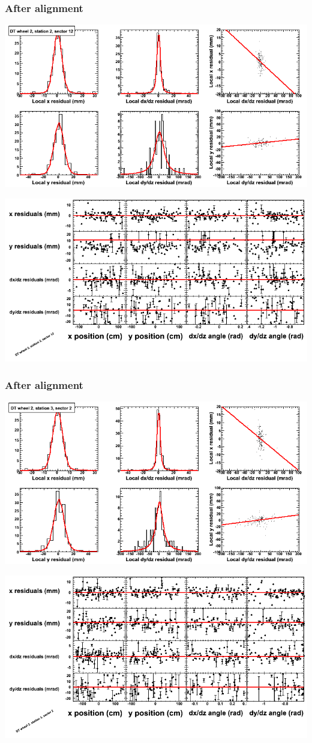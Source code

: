 \documentclass[compress]{beamer}
\begin{document}
\begin{frame}
\frametitle{After alignment}
\includegraphics[width=0.7\linewidth]{NOV4_fitfunctions/MBwhEst2sec12_bellcurves.png}

\includegraphics[width=0.7\linewidth]{NOV4_fitfunctions/MBwhEst2sec12_polynomials.png}
\end{frame}

\begin{frame}
\frametitle{After alignment}
\includegraphics[width=0.7\linewidth]{NOV4_fitfunctions/MBwhEst3sec02_bellcurves.png}

\includegraphics[width=0.7\linewidth]{NOV4_fitfunctions/MBwhEst3sec02_polynomials.png}
\end{frame}
\end{document}
